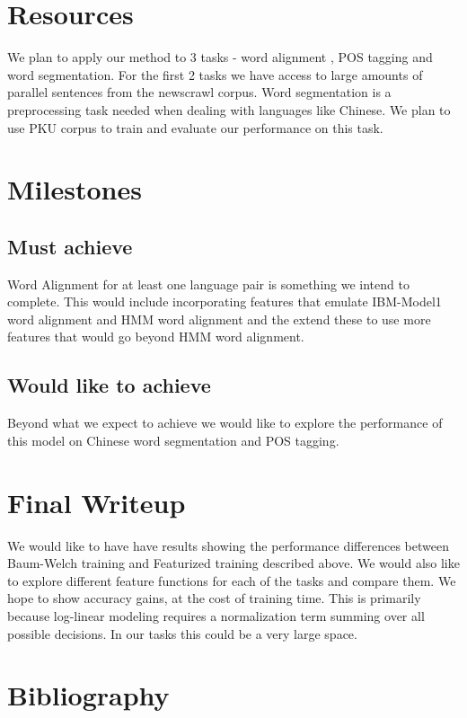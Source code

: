 \documentclass[11pt]{article}
\begin{document}
\section{Resources}
We plan to apply our method to 3 tasks - word alignment , POS tagging and word segmentation. For the first 2 tasks we have access to large amounts of parallel sentences from the newscrawl corpus. Word segmentation is a preprocessing task needed when dealing with languages like Chinese. We plan to use PKU corpus to train and evaluate our performance on this task.

\section{Milestones}
\subsection{Must achieve}
Word Alignment for at least one language pair is something we intend to complete. This would include incorporating features that emulate IBM-Model1 word alignment and HMM word alignment \cite{vogel1996hmm} and the extend these to use more features that would go beyond HMM word alignment.
\subsection{Would like to achieve}
Beyond what we expect to achieve we would like to explore the performance of this model on Chinese word segmentation and POS tagging.


\section{Final Writeup}
We would like to have have results showing the performance differences between Baum-Welch training and Featurized training described above. We would also like to explore different feature functions for each of the tasks and compare them. We hope to show accuracy gains, at the cost of training time. This is primarily because log-linear modeling requires a normalization term summing over all possible decisions. In our tasks this could be a very large space. 

\section{Bibliography}


\end{document}
